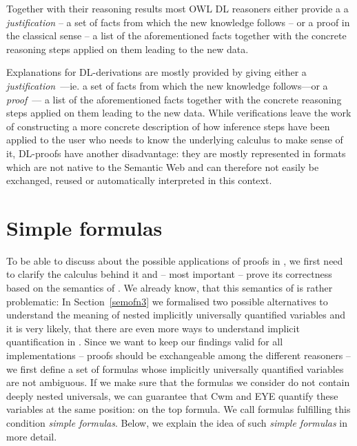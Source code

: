 Together with their reasoning results most OWL DL reasoners either provide a   a \emph{justification} -- a set of facts from which the new knowledge follows --
or a proof in the classical sense -- a list of the aforementioned facts together with the concrete reasoning steps applied on them leading to the new data.


Explanations for DL-derivations are mostly provided by giving either a \emph{justification}~\cite{just1,just2}---ie. a set of facts from which the new knowledge follows---or a \emph{proof}~\cite{owlproof2,owlproof}---%
a list of the aforementioned facts together with the concrete reasoning steps applied on them leading to the new data. 
While verifications leave the work of constructing a more concrete description of how inference steps have been applied to the user who needs to know the underlying calculus to make sense of it,
DL-proofs have another disadvantage: 
they are mostly represented in formats 
which are not native to the Semantic Web and can therefore not easily be exchanged, reused or automatically interpreted in this context.



\section{Simple formulas}
To be able to discuss about the possible applications of proofs in \nthree, we first need to 
clarify the calculus behind it and -- most important -- prove its correctness based on the semantics of \nthree. We already know, 
that this semantics of \nthree is 
rather problematic: In Section~\ref{semofn3} we formalised two possible alternatives to understand the meaning of nested implicitly universally quantified variables
and it is very likely, that there are even more ways to understand implicit quantification in \nthree. 
% 
Since we want to keep our findings valid for all implementations -- proofs should 
be exchangeable among the different reasoners -- we 
first define a set of formulas whose implicitly universally
quantified variables are not ambiguous.  If we make sure that the formulas we consider do not contain deeply nested universals, we can guarantee that Cwm and EYE 
quantify these variables at the same position: on the top formula.
We call formulas fulfilling this condition \emph{simple formulas}. Below, we explain the idea of such \emph{simple formulas} in more detail.



